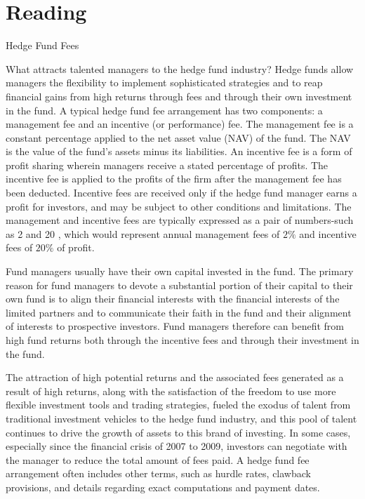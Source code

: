 \documentclass[11pt]{article}
\begin{document}
\section*{Reading}
Hedge Fund Fees

What attracts talented managers to the hedge fund industry? Hedge funds allow managers the flexibility to implement sophisticated strategies and to reap financial gains from high returns through fees and through their own investment in the fund. A typical hedge fund fee arrangement has two components: a management fee and an incentive (or performance) fee. The management fee is a constant percentage applied to the net asset value (NAV) of the fund. The NAV is the value of the fund's assets minus its liabilities. An incentive fee is a form of profit sharing wherein managers receive a stated percentage of profits. The incentive fee is applied to the profits of the firm after the management fee has been deducted. Incentive fees are received only if the hedge fund manager earns a profit for investors, and may be subject to other conditions and limitations. The management and incentive fees are typically expressed as a pair of numbers-such as 2 and 20 , which would represent annual management fees of $2 \%$ and incentive fees of $20 \%$ of profit.

Fund managers usually have their own capital invested in the fund. The primary reason for fund managers to devote a substantial portion of their capital to their own fund is to align their financial interests with the financial interests of the limited partners and to communicate their faith in the fund and their alignment of interests to prospective investors. Fund managers therefore can benefit from high fund returns both through the incentive fees and through their investment in the fund.

The attraction of high potential returns and the associated fees generated as a result of high returns, along with the satisfaction of the freedom to use more flexible investment tools and trading strategies, fueled the exodus of talent from traditional investment vehicles to the hedge fund industry, and this pool of talent continues to drive the growth of assets to this brand of investing. In some cases, especially since the financial crisis of 2007 to 2009, investors can negotiate with the manager to reduce the total amount of fees paid. A hedge fund fee arrangement often includes other terms, such as hurdle rates, clawback provisions, and details regarding exact computations and payment dates.
\end{document}
